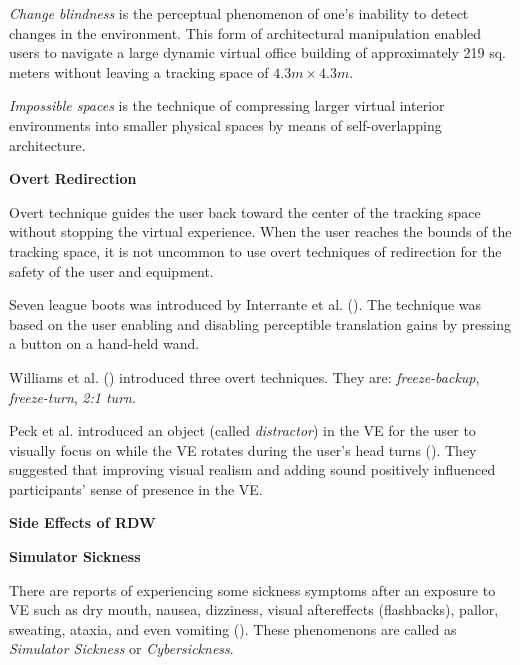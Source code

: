 \documentclass[12pt]{article}
\begin{document}
\emph{Change blindness} is the perceptual phenomenon of one's inability to detect changes in the environment. This form of architectural manipulation enabled users to navigate a large dynamic virtual office building of approximately 219 sq. meters without leaving a tracking space of $4.3m \times 4.3m$.

\emph{Impossible spaces} is the technique of compressing larger virtual interior environments into smaller physical spaces by means of self-overlapping architecture.

\begin{center}\textbf{Overt Redirection}\end{center}

Overt technique guides the user back toward the center of the tracking space without stopping the virtual experience. When the user reaches the bounds of the tracking space, it is not uncommon to use overt techniques of redirection for the safety of the user and equipment.

Seven league boots was introduced by Interrante et al. (\cite{interrante2007seven}). The technique was based on the user enabling and disabling perceptible translation gains by pressing a button on a hand-held wand.

Williams et al. (\cite{williams2007exploring}) introduced three overt techniques. They are: \emph{freeze-backup}, \emph{freeze-turn}, \emph{2:1 turn}.

Peck et al. introduced an object (called \emph{distractor}) in the VE for the user to visually focus on while the VE rotates during the user's head turns (\cite{peck2011evaluation}). They suggested that improving visual realism and adding sound positively influenced participants' sense of presence in the VE.

\begin{center}\textbf{Side Effects of RDW}\end{center}

\noindent
\textbf{Simulator Sickness}

There are reports of experiencing some sickness symptoms after an exposure to VE such as dry mouth, nausea, dizziness, visual aftereffects (flashbacks), pallor, sweating, ataxia, and even vomiting (\cite{razzaque2005redirected}). These phenomenons are called as \emph{Simulator Sickness} or \emph{Cybersickness}.

\newpage

\printbibliography
\end{document}
